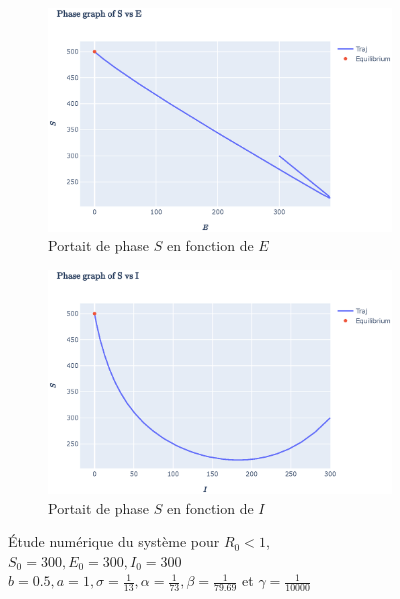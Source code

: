 \documentclass[11pt]{article}
\begin{document}
\begin{figure}[hb]
\begin{subfigure}{0.49\textwidth}
	  \label{fig:numerical study r0 lt 1 b}
	\end{subfigure}\\
	\begin{subfigure}{0.49\textwidth}
	  \centering
	  \includegraphics[width=\linewidth]{../figures/numerical_study_R0_lt1_3.eps}  
	  \caption{Portait de phase $S$ en fonction de $E$}
	  \label{fig:numerical study r0 lt 1 c}
	\end{subfigure}
	\begin{subfigure}{0.49\textwidth}
	  \centering
	  \includegraphics[width=\linewidth]{../figures/numerical_study_R0_lt1_4.eps}  
	  \caption{Portait de phase $S$ en fonction de $I$}
	  \label{fig:numerical study r0 lt 1 d}
	\end{subfigure}
	\centering
	\caption{\'Etude num\'erique du syst\`eme pour $R_0 < 1$, $S_0 = 300, E_0 = 300, I_0 = 300$ \\
	$b =0.5, a = 1, \sigma = \frac{1}{13}, \alpha = \frac{1}{73}, \beta = \frac{1}{79.69}$ et $\gamma = \frac{1}{10000}$
	}
	\label{fig:numerical study r0 lt 1}
\end{figure}
\end{document}

